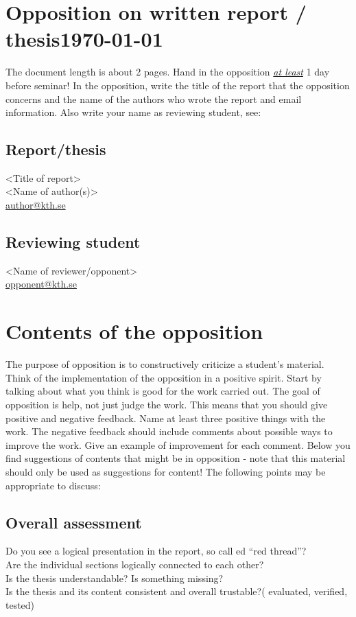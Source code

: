 \documentclass[11pt,a4paper]{article}
\newcommand{\email}[1]{\href{mailto:#1}{#1}}
\begin{document}
\section*{Opposition on written report / thesis\hfill\footnotesize\today}
The document length is about 2 pages. Hand in the opposition \underline{\textit{at least}} 1 day before seminar! In the opposition, write the title of the report that the opposition concerns and the name of the authors who wrote the report and email information. Also write your name as reviewing 
student, see:
\subsection*{Report/thesis}
<Title of report>\\
<Name of author(s)>\\
\email{author@kth.se}
\subsection*{Reviewing student}
<Name of reviewer/opponent>\\
\email{opponent@kth.se}

\section*{Contents of the opposition}
The purpose of opposition is to constructively criticize a student’s material. Think of the implementation of the opposition in a positive spirit. Start by talking about what you think is 
good for the work carried out. The goal of opposition is help, not just judge the work. This 
means that you should give positive and negative feedback. Name at least three positive 
things with the work. The negative feedback should include comments about possible ways to 
improve the work. Give an example of improvement for each comment. Below you find suggestions of contents that might be in opposition - note that this material should only be used as suggestions for content! The following points may be appropriate to discuss:

\subsection*{Overall assessment}
Do you see a logical presentation in the report, so call
ed “red thread”?\\
Are the individual sections logically connected to each other?\\
Is the thesis understandable? Is something missing?\\
Is the thesis and its content consistent and overall trustable?( evaluated, verified, tested) 
\end{document}
